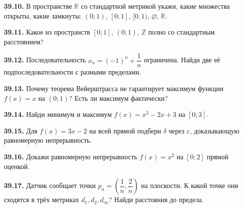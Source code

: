 \noindent\begin{minipage}[t]{\linewidth}\textbf{39.10.} В пространстве \(\mathbb R\) со стандартной метрикой укажи, какие множества открыты, какие замкнуты: \((0;1)\), \([0;1]\), \([0;1)\), \(\varnothing\), \(\mathbb R\).\par\end{minipage}\par
\noindent\begin{minipage}[t]{\linewidth}\textbf{39.11.} Какое из пространств \([0;1]\), \((0;1)\), \(\mathbb Z\) полно со стандартным расстоянием?\par\end{minipage}\par
\noindent\begin{minipage}[t]{\linewidth}\textbf{39.12.} Последовательность \(x_n=(-1)^n+\dfrac1n\) ограничена. Найди две её подпоследовательности с разными пределами.\par\end{minipage}\par
\noindent\begin{minipage}[t]{\linewidth}\textbf{39.13.} Почему теорема Вейерштрасса не гарантирует максимум функции \(f(x)=x\) на \((0;1)\)? Есть ли максимум фактически?\par\end{minipage}\par
\noindent\begin{minipage}[t]{\linewidth}\textbf{39.14.} Найди минимум и максимум \(f(x)=x^2-2x+3\) на \([0;3]\).\par\end{minipage}\par
\noindent\begin{minipage}[t]{\linewidth}\textbf{39.15.} Для \(f(x)=3x-2\) на всей прямой подбери \(\delta\) через \(\varepsilon\), доказывающую равномерную непрерывность.\par\end{minipage}\par
\noindent\begin{minipage}[t]{\linewidth}\textbf{39.16.} Докажи равномерную непрерывность \(f(x)=x^2\) на \([0;2]\) прямой оценкой.\par\end{minipage}\par
\noindent\begin{minipage}[t]{\linewidth}\textbf{39.17.} Датчик сообщает точки \(p_n=(\dfrac1n,\dfrac2n)\) на плоскости. К какой точке они сходятся в трёх метриках \(d_1,d_2,d_\infty\)? Найди расстояния до предела.\par\end{minipage}\par
